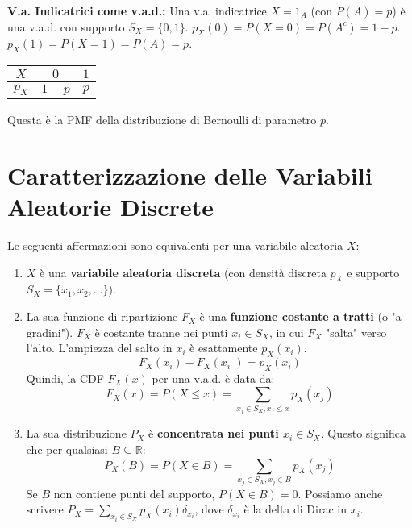 \textbf{V.a. Indicatrici come v.a.d.:}
Una v.a. indicatrice $X=1_A$ (con $P(A)=p$) è una v.a.d. con supporto $S_X=\{0,1\}$.
$p_X(0) = P(X=0) = P(A^c) = 1-p$.
$p_X(1) = P(X=1) = P(A) = p$.
\begin{center}
\begin{tabular}{c|cc}
$X$ & $0$ & $1$ \\
\hline
$p_X$ & $1-p$ & $p$ \\
\end{tabular}
\end{center}
Questa è la PMF della distribuzione di Bernoulli di parametro $p$.

\section{Caratterizzazione delle Variabili Aleatorie Discrete}
Le seguenti affermazioni sono equivalenti per una variabile aleatoria $X$:
\begin{enumerate}
    \item $X$ è una \textbf{variabile aleatoria discreta} (con densità discreta $p_X$ e supporto $S_X = \{x_1, x_2, \dots\}$).
    \item La sua funzione di ripartizione $F_X$ è una \textbf{funzione costante a tratti} (o "a gradini"). $F_X$ è costante tranne nei punti $x_i \in S_X$, in cui $F_X$ "salta" verso l'alto. L'ampiezza del salto in $x_i$ è esattamente $p_X(x_i)$.
    \[ F_X(x_i) - F_X(x_i^-) = p_X(x_i) \]
    Quindi, la CDF $F_X(x)$ per una v.a.d. è data da:
    \[ F_X(x) = P(X \le x) = \sum_{x_j \in S_X, x_j \le x} p_X(x_j) \]
    \item La sua distribuzione $P_X$ è \textbf{concentrata nei punti $x_i \in S_X$}. Questo significa che per qualsiasi $B \subseteq \mathbb{R}$:
    \[ P_X(B) = P(X \in B) = \sum_{x_j \in S_X, x_j \in B} p_X(x_j) \]
    Se $B$ non contiene punti del supporto, $P(X \in B) = 0$.
    Possiamo anche scrivere $P_X = \sum_{x_i \in S_X} p_X(x_i) \delta_{x_i}$, dove $\delta_{x_i}$ è la delta di Dirac in $x_i$.
\end{enumerate}

